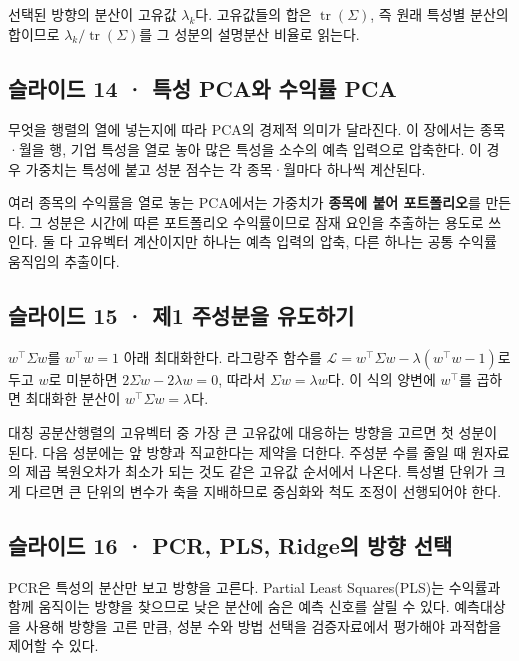 \documentclass[11pt,a4paper]{article}
\begin{document}
선택된 방향의 분산이 고유값 $\lambda_k$다. 고유값들의 합은 $\operatorname{tr}(\Sigma)$, 즉 원래 특성별 분산의 합이므로 $\lambda_k/\operatorname{tr}(\Sigma)$를 그 성분의 설명분산 비율로 읽는다.\par

\subsection{슬라이드 14 · 특성 PCA와 수익률 PCA}
무엇을 행렬의 열에 넣는지에 따라 PCA의 경제적 의미가 달라진다. 이 장에서는 종목·월을 행, 기업 특성을 열로 놓아 많은 특성을 소수의 예측 입력으로 압축한다. 이 경우 가중치는 특성에 붙고 성분 점수는 각 종목·월마다 하나씩 계산된다.\par

여러 종목의 수익률을 열로 놓는 PCA에서는 가중치가 \textbf{종목에 붙어 포트폴리오}를 만든다. 그 성분은 시간에 따른 포트폴리오 수익률이므로 잠재 요인을 추출하는 용도로 쓰인다. 둘 다 고유벡터 계산이지만 하나는 예측 입력의 압축, 다른 하나는 공통 수익률 움직임의 추출이다.\par

\subsection{슬라이드 15 · 제1 주성분을 유도하기}
$w^\top\Sigma w$를 $w^\top w=1$ 아래 최대화한다. 라그랑주 함수를 $\mathcal L=w^\top\Sigma w-\lambda(w^\top w-1)$로 두고 $w$로 미분하면 $2\Sigma w-2\lambda w=0$, 따라서 $\Sigma w=\lambda w$다. 이 식의 양변에 $w^\top$를 곱하면 최대화한 분산이 $w^\top\Sigma w=\lambda$다.\par

대칭 공분산행렬의 고유벡터 중 가장 큰 고유값에 대응하는 방향을 고르면 첫 성분이 된다. 다음 성분에는 앞 방향과 직교한다는 제약을 더한다. 주성분 수를 줄일 때 원자료의 제곱 복원오차가 최소가 되는 것도 같은 고유값 순서에서 나온다. 특성별 단위가 크게 다르면 큰 단위의 변수가 축을 지배하므로 중심화와 척도 조정이 선행되어야 한다.\par

\subsection{슬라이드 16 · PCR, PLS, Ridge의 방향 선택}
PCR은 특성의 분산만 보고 방향을 고른다. Partial Least Squares(PLS)는 수익률과 함께 움직이는 방향을 찾으므로 낮은 분산에 숨은 예측 신호를 살릴 수 있다. 예측대상을 사용해 방향을 고른 만큼, 성분 수와 방법 선택을 검증자료에서 평가해야 과적합을 제어할 수 있다.\par
\end{document}

